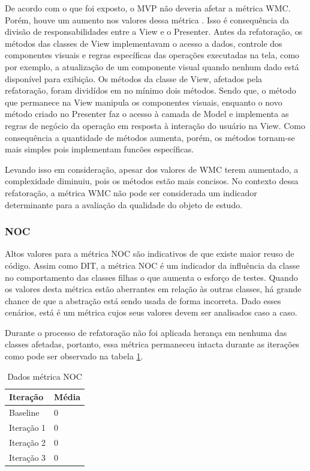\documentclass[conference]{IEEEtran}
\begin{document}
De acordo com o que foi exposto, o MVP não deveria afetar a métrica WMC. Porém,
houve um aumento nos valores dessa métrica . Isso é consequência da divisão de
responsabilidades entre a View e o Presenter. Antes da refatoração, os métodos
das classes de View implementavam o acesso a dados, controle dos componentes
visuais e regras específicas das operações executadas na tela, como por exemplo,
a atualização de um componente visual quando nenhum dado está disponível para
exibição. Os métodos da classe de View, afetados pela refatoração, foram
dividídos em no mínimo dois métodos. Sendo que, o método que permanece na View
manipula os componentes visuais, enquanto o novo método criado no Presenter faz
o acesso à camada de Model e implementa as regras de negócio da operação em
resposta à interação do usuário na View. Como consequência a quantidade de
métodos aumenta, porém, os métodos tornam-se mais simples pois implementam
funcões específicas. 

Levando isso em consideração, apesar dos valores de WMC
terem aumentado, a complexidade diminuiu, pois os métodos estão mais concisos.
No contexto dessa refatoração, a métrica WMC não pode ser considerada um
indicador determinante para a avaliação da qualidade do objeto de estudo.


\subsubsection{NOC}

Altos valores para a métrica NOC são indicativos de que existe maior reuso de
código. Assim como DIT, a métrica NOC é um indicador da influência da classe
no comportamento das classes filhas o que aumenta o esforço de testes. Quando os
valores desta métrica estão aberrantes em relação às outras classes, há grande
chance de que a abstração está sendo usada de forma incorreta. Dado esses cenários, está é um métrica cujos
seus valores devem ser analisados caso a caso.

Durante o processo de refatoração não foi aplicada herança em nenhuma das
classes afetadas, portanto, essa métrica permaneceu intacta durante as iterações
como pode ser observado na tabela \ref{tab:noc}. %

\begin{table}[!h]
	\centering
	    \caption{\label{tab:noc} Dados métrica NOC}
    \begin{tabular}{ | l | l | }
    \hline
    Iteração & Média 			\\ \hline
    Baseline & 0  	\\ \hline
    Iteração 1 & 0			\\ \hline
	Iteração 2 & 0				\\ \hline
	Iteração 3 & 0	\\ \hline
    \end{tabular}
    
\end{table}
\end{document}
